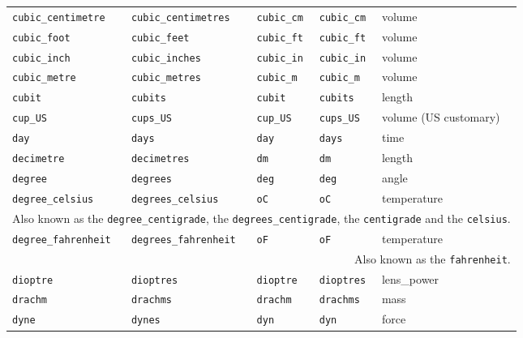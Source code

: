 \begin{landscape}
\begin{center}
\begin{longtable}{|lllll|}
{\tt\footnotesize cubic\_centimetre} & {\tt\footnotesize cubic\_centimetres} & {\tt\footnotesize cubic\_cm} & {\tt\footnotesize cubic\_cm} & volume \\
{\tt\footnotesize cubic\_foot} & {\tt\footnotesize cubic\_feet} & {\tt\footnotesize cubic\_ft} & {\tt\footnotesize cubic\_ft} & volume \\
{\tt\footnotesize cubic\_inch} & {\tt\footnotesize cubic\_inches} & {\tt\footnotesize cubic\_in} & {\tt\footnotesize cubic\_in} & volume \\
{\tt\footnotesize cubic\_metre} & {\tt\footnotesize cubic\_metres} & {\tt\footnotesize cubic\_m} & {\tt\footnotesize cubic\_m} & volume \\
{\tt\footnotesize cubit} & {\tt\footnotesize cubits} & {\tt\footnotesize cubit} & {\tt\footnotesize cubits} & length \\
{\tt\footnotesize cup\_US} & {\tt\footnotesize cups\_US} & {\tt\footnotesize cup\_US} & {\tt\footnotesize cups\_US} & volume (US customary) \\
{\tt\footnotesize day} & {\tt\footnotesize days} & {\tt\footnotesize day} & {\tt\footnotesize days} & time \\
{\tt\footnotesize decimetre} & {\tt\footnotesize decimetres} & {\tt\footnotesize dm} & {\tt\footnotesize dm} & length \\
{\tt\footnotesize degree} & {\tt\footnotesize degrees} & {\tt\footnotesize deg} & {\tt\footnotesize deg} & angle \\
{\tt\footnotesize degree\_celsius} & {\tt\footnotesize degrees\_celsius} & {\tt\footnotesize oC} & {\tt\footnotesize oC} & temperature \\
\multicolumn{5}{|r|}{\footnotesize Also known as the {\tt degree\_centigrade}, the {\tt degrees\_centigrade}, the {\tt centigrade} and the {\tt celsius}.} \\
{\tt\footnotesize degree\_fahrenheit} & {\tt\footnotesize degrees\_fahrenheit} & {\tt\footnotesize oF} & {\tt\footnotesize oF} & temperature \\
\multicolumn{5}{|r|}{\footnotesize Also known as the {\tt fahrenheit}.} \\
{\tt\footnotesize dioptre} & {\tt\footnotesize dioptres} & {\tt\footnotesize dioptre} & {\tt\footnotesize dioptres} & lens\_power \\
{\tt\footnotesize drachm} & {\tt\footnotesize drachms} & {\tt\footnotesize drachm} & {\tt\footnotesize drachms} & mass \\
{\tt\footnotesize dyne} & {\tt\footnotesize dynes} & {\tt\footnotesize dyn} & {\tt\footnotesize dyn} & force \\

\end{longtable}
\end{center}
\end{landscape}
